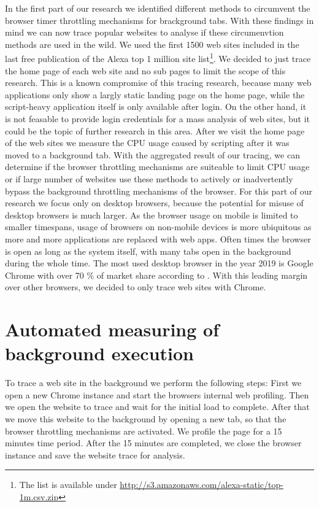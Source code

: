 \documentclass[
	ruledheaders=section,%
	class=report,%
	thesis={type=bachelor},%
	accentcolor=9c,%
	custommargins=true,%
	marginpar=false,%
	parskip=half-,%
	fontsize=11pt,%
]{tudapub}
\begin{document}
  In the first part of our research we identified different methods to circumvent the browser timer throttling mechanisms for brackground tabs. With these findings in mind we can now trace popular websites to analyse if these circumenvtion methods are used in the wild. We used the first 1500 web sites included in the last free publication of the Alexa top 1 million site list\footnote{The list is available under \url{http://s3.amazonaws.com/alexa-static/top-1m.csv.zip}}. We decided to just trace the home page of each web site and no sub pages to limit the scope of this research. This is a known compromise of this tracing research, because many web applications only show a largly static landing page on the home page, while the script-heavy application itself is only available after login. On the other hand, it is not feasable to provide login credentials for a mass analysis of web sites, but it could be the topic of further research in this area. After we visit the home page of the web sites we measure the CPU usage caused by scripting after it was moved to a background tab. With the aggregated result of our tracing, we can determine if the browser throttling mechanisms are suiteable to limit CPU usage or if large number of websites use these methods to actively or inadvertently bypass the background throttling mechanisms of the browser. For this part of our research we focus only on desktop browsers, because the potential for misuse of desktop browsers is much larger. As the browser usage on mobile is limited to smaller timespans, usage of browsers on non-mobile devices is more ubiquitous as more and more applications are replaced with web apps. Often times the browser is open as long as the system itself, with many tabs open in the background during the whole time. The most used desktop browser in the year 2019 is Google Chrome with over 70 \% of market share according to \cite{statcounter-desktop-browser-market-share}. With this leading margin over other browsers, we decided to only trace web sites with Chrome.
  
  \section{Automated measuring of background execution}

  To trace a web site in the background we perform the following steps: First we open a new Chrome instance and start the browsers internal web profiling. Then we open the website to trace and wait for the initial load to complete. After that we move this website to the background by opening a new tab, so that the browser throttling mechanisms are activated. We profile the page for a 15 minutes time period. After the 15 minutes are completed, we close the browser instance and save the website trace for analysis.
    
\end{document}

